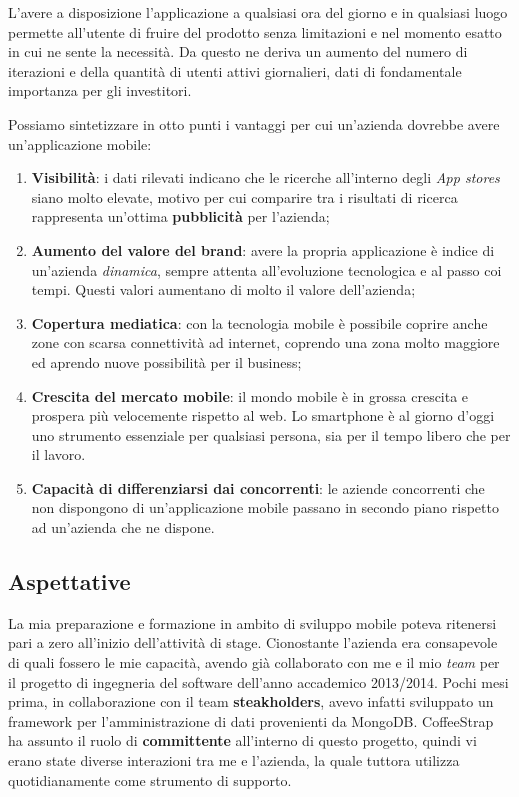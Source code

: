L'avere a disposizione l'applicazione a qualsiasi ora del giorno e in qualsiasi luogo permette all'utente di fruire del prodotto senza limitazioni e nel momento esatto in cui ne sente la necessità. Da questo ne deriva un aumento del numero di iterazioni e della quantità di utenti attivi giornalieri, dati di fondamentale importanza per gli investitori.

Possiamo sintetizzare in otto punti i vantaggi per cui un'azienda dovrebbe avere un'applicazione mobile:

\begin{enumerate}

\item \textbf{Visibilità}: i dati rilevati indicano che le ricerche all'interno degli \textit{App stores} siano molto elevate, motivo per cui comparire tra i risultati di ricerca rappresenta un'ottima \textbf{pubblicità} per l'azienda;
\item \textbf{Aumento del valore del brand}: avere la propria applicazione è indice di un'azienda \textit{dinamica}, sempre attenta all'evoluzione tecnologica e al passo coi tempi. Questi valori aumentano di molto il valore dell'azienda;
\item \textbf{Copertura mediatica}: con la tecnologia mobile è possibile coprire anche zone con scarsa connettività ad internet, coprendo una zona molto maggiore ed aprendo nuove possibilità per il business;
\item \textbf{Crescita del mercato mobile}: il mondo mobile è in grossa crescita e prospera più velocemente rispetto al web. Lo smartphone è al giorno d'oggi uno strumento essenziale per qualsiasi persona, sia per il tempo libero che per il lavoro.
\item \textbf{Capacità di differenziarsi dai concorrenti}: le aziende concorrenti che non dispongono di un'applicazione mobile passano in secondo piano rispetto ad un'azienda che ne dispone.

\end{enumerate}

\subsection{Aspettative}

La mia preparazione e formazione in ambito di sviluppo mobile poteva ritenersi pari a zero all'inizio dell'attività di stage. Cionostante l'azienda era consapevole di quali fossero le mie capacità, avendo già collaborato con me e il mio \textit{team} per il progetto di ingegneria del software dell'anno accademico 2013/2014. Pochi mesi prima, in collaborazione con il team \textbf{steakholders}, avevo infatti sviluppato un framework per l'amministrazione di dati provenienti da MongoDB. CoffeeStrap ha assunto il ruolo di \textbf{committente} all'interno di questo progetto, quindi vi erano state diverse interazioni tra me e l'azienda, la quale tuttora utilizza quotidianamente come strumento di supporto.

